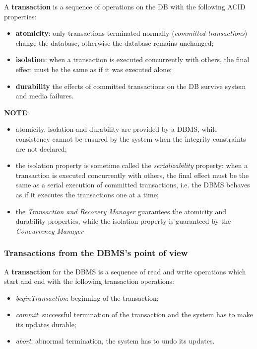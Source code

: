 \begin{tcolorbox}
A \textbf{transaction} is a sequence of operations on the DB with the following ACID properties:

\begin{itemize}
    \item \textbf{atomicity}: only transactions terminated normally (\textit{committed transactions}) change the database, otherwise the database remains unchanged;

    \item \textbf{isolation}: when a transaction is executed concurrently with others, the final effect must be the same as if it was executed alone;
    
    \item \textbf{durability} the effects of committed transactions on the DB survive system and media failures.
    
\end{itemize}

\end{tcolorbox}

\textbf{NOTE}: 

\begin{itemize}
    \item atomicity, isolation and durability are provided by a DBMS, while consistency cannot be ensured by the system when the integrity constraints are not declared;
    
    \item the isolation property is sometime called the \textit{serializability} property: when a transaction is executed concurrently with others, the final effect must be the same as a serial execution of committed transactions, i.e. the DBMS behaves as if it executes the transactions one at a time;

    \item the \textit{Transaction and Recovery Manager} guarantees the atomicity and durability properties, while the isolation property is guaranteed by the \textit{Concurrency Manager}
    
\end{itemize}


\subsubsection{Transactions from the DBMS's point of view}

\begin{tcolorbox}
A \textbf{transaction} for the DBMS is a sequence of read and write operations which start and end with the following transaction operations: 

\begin{itemize}
    \item \textit{beginTransaction}: beginning of the transaction;
    \item \textit{commit}: successful termination of the transaction and the system has to make its updates durable;
    \item \textit{abort}: abnormal termination, the system has to undo its updates.
\end{itemize}

\end{tcolorbox}

